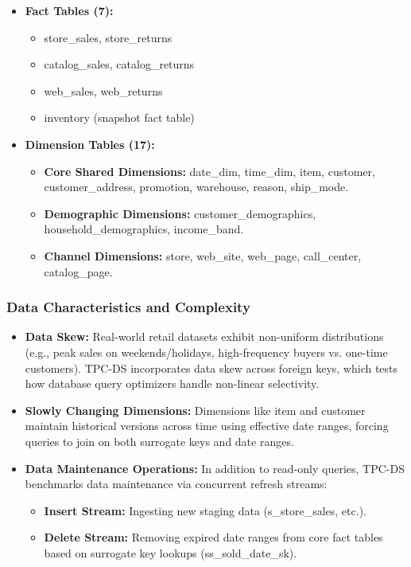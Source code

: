 \documentclass{ULBreport}
\begin{document}
\begin{itemize}
    \item \textbf{Fact Tables (7):}
        \begin{itemize}
            \item store\_sales, store\_returns
            \item catalog\_sales, catalog\_returns
            \item web\_sales, web\_returns
            \item inventory (snapshot fact table)
        \end{itemize}
    \item \textbf{Dimension Tables (17):}
        \begin{itemize}
            \item \textbf{Core Shared Dimensions:} date\_dim, time\_dim, item, customer, customer\_address, promotion, warehouse, reason, ship\_mode.
            \item \textbf{Demographic Dimensions:} customer\_demographics, household\_demographics, income\_band.
            \item \textbf{Channel Dimensions:} store, web\_site, web\_page, call\_center, catalog\_page.
        \end{itemize}
\end{itemize}

\subsubsection{Data Characteristics and Complexity}

\begin{itemize}
    \item \textbf{Data Skew:} Real-world retail datasets exhibit non-uniform distributions (e.g., peak sales on weekends/holidays, high-frequency buyers vs. one-time customers). TPC-DS incorporates data skew across foreign keys, which tests how database query optimizers handle non-linear selectivity.
    \item \textbf{Slowly Changing Dimensions:} Dimensions like item and customer maintain historical versions across time using effective date ranges, forcing queries to join on both surrogate keys and date ranges.
    \item \textbf{Data Maintenance Operations:} In addition to read-only queries, TPC-DS benchmarks data maintenance via concurrent refresh streams:
    \begin{itemize}
        \item \textbf{Insert Stream:} Ingesting new staging data (s\_store\_sales, etc.).
        \item \textbf{Delete Stream:} Removing expired date ranges from core fact tables based on surrogate key lookups (ss\_sold\_date\_sk).
    \end{itemize}
\end{itemize}
\end{document}
